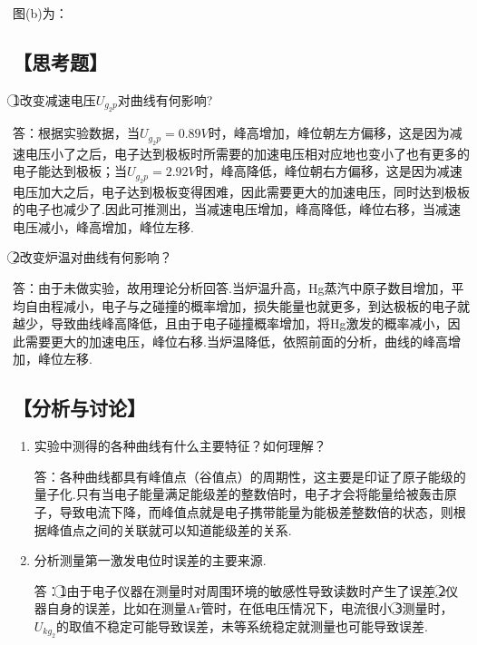 \documentclass[12pt,a4paper,UTF8]{ctexart}
\begin{document}
	\par
	图(b)为：
	\begin{figure}[htbp]
	\end{figure}
\subsection*{【思考题】}
\textcircled{1}改变减速电压$U_{g_2p}$对曲线有何影响?\par
答：根据实验数据，当$U_{g_2p}=0.89V$时，峰高增加，峰位朝左方偏移，这是因为减速电压小了之后，电子达到极板时所需要的加速电压相对应地也变小了也有更多的电子能达到极板；当$U_{g_2p}=2.92V$时，峰高降低，峰位朝右方偏移，这是因为减速电压加大之后，电子达到极板变得困难，因此需要更大的加速电压，同时达到极板的电子也减少了.因此可推测出，当减速电压增加，峰高降低，峰位右移，当减速电压减小，峰高增加，峰位左移.\par
\textcircled{2}改变炉温对曲线有何影响？\par
答：由于未做实验，故用理论分析回答.当炉温升高，Hg蒸汽中原子数目增加，平均自由程减小，电子与之碰撞的概率增加，损失能量也就更多，到达极板的电子就越少，导致曲线峰高降低，且由于电子碰撞概率增加，将Hg激发的概率减小，因此需要更大的加速电压，峰位右移.当炉温降低，依照前面的分析，曲线的峰高增加，峰位左移.
\subsection*{【分析与讨论】}
\begin{enumerate}[1.]
\item 实验中测得的各种曲线有什么主要特征？如何理解？ \par
答：各种曲线都具有峰值点（谷值点）的周期性，这主要是印证了原子能级的量子化.只有当电子能量满足能级差的整数倍时，电子才会将能量给被轰击原子，导致电流下降，而峰值点就是电子携带能量为能极差整数倍的状态，则根据峰值点之间的关联就可以知道能级差的关系.
\item 分析测量第一激发电位时误差的主要来源.\par
答：\textcircled{1}由于电子仪器在测量时对周围环境的敏感性导致读数时产生了误差.\textcircled{2}仪器自身的误差，比如在测量Ar管时，在低电压情况下，电流很小.\textcircled{3}测量时，$U_{kg_2}$的取值不稳定可能导致误差，未等系统稳定就测量也可能导致误差.
\end{enumerate}
\end{document}
